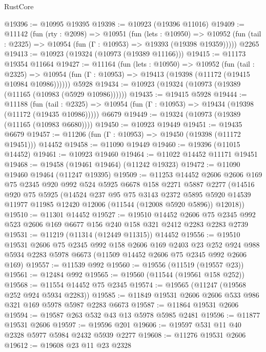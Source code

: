 \begin{lexlean}{RustCore}
\begin{coremodule}
@19396 := @10995 @19395
@19398 := @10923 (@19396 @11016)
@19409 := @11142
    (fun (rty : @2098) =>
    @10951
      (fun (lets : @10950) =>
      @10952 (fun (tail : @2325) => @10954 (fun (Γ : @10953) => @19393 (@19398 @19359)))))
    @2265
@19413 := @10923 (@19324 (@10973 (@19389 @11166)))
@19415 := @11173 @19354 @11664
@19427 := @11164
    (fun (lets : @10950) =>
    @10952
      (fun (tail : @2325) =>
      @10954 (fun (Γ : @10953) => @19413 (@19398 (@11172 (@19415 @10984 @10986))))))
    @5928
@19434 := @10923 (@19324 (@10973 (@19389 (@11165 (@10983 (@5929 @10986))))))
@19435 := @19415 @5928
@19444 := @11188
    (fun (tail : @2325) => @10954 (fun (Γ : @10953) => @19434 (@19398 (@11172 (@19435 @10986)))))
    @6679
@19449 := @19324 (@10973 (@19389 (@11165 (@10983 @6680))))
@19450 := @10923 @19449
@19451 := @19435 @6679
@19457 := @11206 (fun (Γ : @10953) => @19450 (@19398 (@11172 @19451))) @14452
@19458 := @11090 @19449
@19460 := @19396 (@11015 @14452)
@19461 := @10923 @19460
@19464 := @11022 @14452 @11171 @19451
@19468 := @19458 (@19461 @19464) (@11242 @19323)
@19472 := @11090 @19460 @19464 (@11247 @19395)
@19509 := @11253
    @14452
    @2606
    @2606
    @169
    @75
    @2345
    @920
    @992
    @524
    @5925
    @6678
    @158
    @2271
    @5887
    @2277
    (@14516
      @920
      @75
      @5925
      (@14524
        @237
        @95
        @75
        @3143
        @2372
        @5895
        @5920
        @14539
        @11977
        @11985
        @12420
        @12006
        (@11544 (@12008 @5920 @5896))
        @12018))
@19510 := @11301 @14452
@19527 := @19510
    @14452
    @2606
    @75
    @2345
    @992
    @523
    @2606
    @169
    @6677
    @156
    @240
    @158
    @321
    @2412
    @2283
    @2283
    @2739
@19531 := @11219 (@11314 (@12449 @11315)) @14452
@19556 := @19510
    @19531
    @2606
    @75
    @2345
    @992
    @158
    @2606
    @169
    @2403
    @23
    @252
    @924
    @988
    @5934
    @2283
    @5978
    @6673
    (@11509 @14452 @2606 @75 @2345 @992 @2606 @169)
@19557 := @11539 @992
@19560 := @19556 (@11519 (@19557 @23))
@19561 := @12484 @992
@19565 := @19560 (@11544 (@19561 @158 @252))
@19568 := @11554 @14452 @75 @2345
@19574 := @19565 (@11247 (@19568 @252 @924 @5934 @2283))
@19585 := @11849 @19531 @2606 @2606 @533 @986 @321 @169 @5978 @5987 @2283 @6673
@19587 := @11864 @19531 @2606
@19594 := @19587 @263 @532 @43 @13 @5978 @5985 @2481
@19596 := @11877 @19531 @2606
@19597 := @19596 @201
@19606 := @19597 @531 @11 @40 @2328 @5977 @5984 @2432 @5939 @2277
@19608 := @11276 @19531 @2606
@19612 := @19608 @23 @11 @23 @2328

\end{coremodule}
\end{lexlean}

